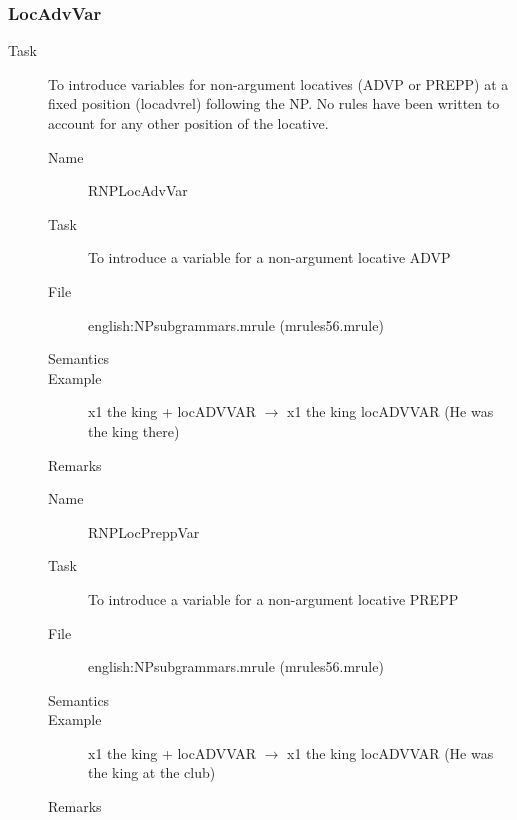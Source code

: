 \begin{description}
\begin{description}
\end{description}

\subsubsection{LocAdvVar}
\begin{description}
\item[Task] To introduce variables for non-argument locatives (ADVP or PREPP) 
at a fixed position (locadvrel) following the NP. No rules have been 
written to account for any other position 
of the locative.

\vspace{1 cm}
\begin{description}
\item[Name] RNPLocAdvVar
\item[Task] To introduce a variable for a non-argument locative ADVP 
\item[File] english:NPsubgrammars.mrule (mrules56.mrule)
\item[Semantics]
\item[Example] x1 the king + locADVVAR $\rightarrow$ x1 the king locADVVAR
(He was the king there)
\item[Remarks]
\end{description}

\vspace{1 cm}
\begin{description}
\item[Name] RNPLocPreppVar
\item[Task] To introduce a variable for a non-argument locative PREPP
\item[File] english:NPsubgrammars.mrule (mrules56.mrule)
\item[Semantics]
\item[Example] x1 the king + locADVVAR $\rightarrow$ x1 the king locADVVAR
(He was the king at the club)
\item[Remarks]
\end{description}

\end{description}

\end{description}


